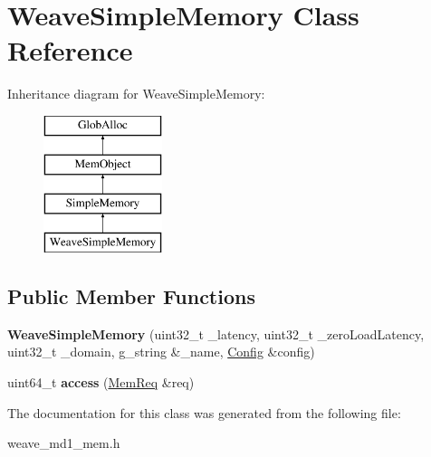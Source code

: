 \hypertarget{classWeaveSimpleMemory}{\section{Weave\-Simple\-Memory Class Reference}
\label{classWeaveSimpleMemory}
}
Inheritance diagram for Weave\-Simple\-Memory\-:\begin{figure}[H]
\begin{center}
\leavevmode
\includegraphics[height=4.000000cm]{classWeaveSimpleMemory}
\end{center}
\end{figure}
\subsection*{Public Member Functions}
\begin{DoxyCompactItemize}
\item 
\hypertarget{classWeaveSimpleMemory_a2bb9e083f3226144a5b94b09c574258f}{{\bfseries Weave\-Simple\-Memory} (uint32\-\_\-t \-\_\-latency, uint32\-\_\-t \-\_\-zero\-Load\-Latency, uint32\-\_\-t \-\_\-domain, g\-\_\-string \&\-\_\-name, \hyperlink{classConfig}{Config} \&config)}\label{classWeaveSimpleMemory_a2bb9e083f3226144a5b94b09c574258f}

\item 
\hypertarget{classWeaveSimpleMemory_a0d141c7a3424ded10f053c3cd7b72368}{uint64\-\_\-t {\bfseries access} (\hyperlink{structMemReq}{Mem\-Req} \&req)}\label{classWeaveSimpleMemory_a0d141c7a3424ded10f053c3cd7b72368}

\end{DoxyCompactItemize}


The documentation for this class was generated from the following file\-:\begin{DoxyCompactItemize}
\item 
weave\-\_\-md1\-\_\-mem.\-h\end{DoxyCompactItemize}
